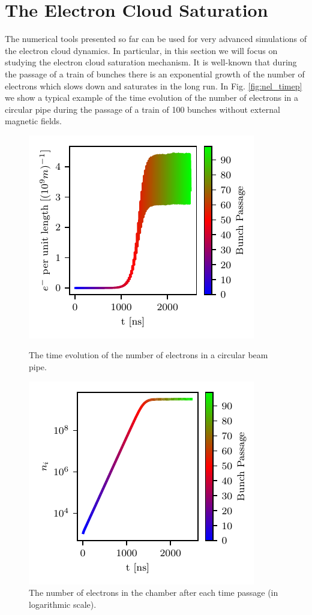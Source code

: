 \section{The Electron Cloud Saturation}
The numerical tools presented so far can be used for very advanced simulations of the electron cloud dynamics. In particular, in this section we will focus on studying the electron cloud saturation mechanism. It is well-known that during the passage of a train of bunches there is an exponential growth of the number of electrons which slows down and saturates in the long run. In Fig. \ref{fig:nel_timep} we show a typical example of the time evolution of the number of electrons in a circular pipe during the passage of a train of 100 bunches without external magnetic fields. 
\begin{figure}
\RawFloats
\begin{minipage}[c]{0.5\linewidth}
\includegraphics[scale=1.4]{chapters/Chapter1/Figures/nel_timep_sat.pdf}
\caption{The time evolution of the number of electrons in a circular beam pipe. \linebreak}
\label{fig:nel_timep}
\end{minipage}
\hfill
\begin{minipage}[c]{0.5\linewidth}
\includegraphics[scale=1.4]{chapters/Chapter1/Figures/nel_bunch_sat.pdf}
\caption{The number of electrons in the chamber after each time passage (in logarithmic scale).}
\label{fig:nel_bunch}
\end{minipage}%
\end{figure}

